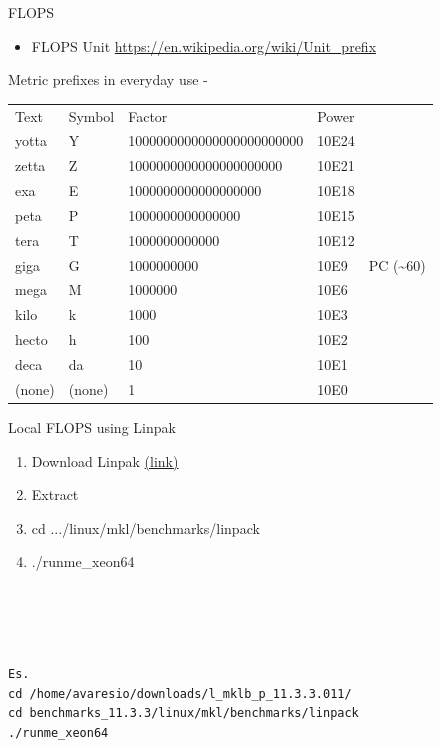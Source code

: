 \documentclass[ignorenonframetext,]{beamer}
\providecommand{\tightlist}{%
  \setlength{\itemsep}{0pt}\setlength{\parskip}{0pt}}
\begin{document}
\begin{frame}{FLOPS}


\begin{itemize}
\tightlist
\item
  FLOPS Unit \url{https://en.wikipedia.org/wiki/Unit_prefix}
\end{itemize}

Metric prefixes in everyday use -

\begin{longtable}[]{@{}lllll@{}}
\toprule
\endhead
Text & Symbol & Factor & Power &\tabularnewline
yotta & Y & 1000000000000000000000000 & 10E24 &\tabularnewline
zetta & Z & 1000000000000000000000 & 10E21 &\tabularnewline
exa & E & 1000000000000000000 & 10E18 &\tabularnewline
peta & P & 1000000000000000 & 10E15 &\tabularnewline
tera & T & 1000000000000 & 10E12 &\tabularnewline
giga & G & 1000000000 & 10E9 & PC (\textasciitilde{}60)\tabularnewline
mega & M & 1000000 & 10E6 &\tabularnewline
kilo & k & 1000 & 10E3 &\tabularnewline
hecto & h & 100 & 10E2 &\tabularnewline
deca & da & 10 & 10E1 &\tabularnewline
(none) & (none) & 1 & 10E0 &\tabularnewline
\bottomrule
\end{longtable}

\end{frame}

\begin{frame}[fragile]{Local FLOPS using Linpak}

\begin{enumerate}
\tightlist
\item
  Download Linpak
  \href{https://software.intel.com/en-us/articles/intel-mkl-benchmarks-suite}{(link)}
\item
  Extract
\item
  cd .../linux/mkl/benchmarks/linpack
\item
  ./runme\_xeon64
\end{enumerate}

\begin{verbatim}




Es.
cd /home/avaresio/downloads/l_mklb_p_11.3.3.011/
cd benchmarks_11.3.3/linux/mkl/benchmarks/linpack
./runme_xeon64
\end{verbatim}

\end{frame}
\end{document}
